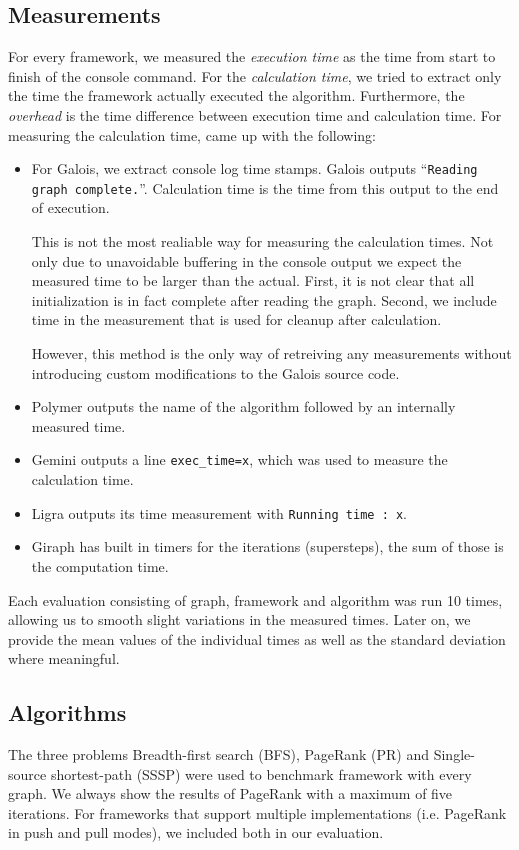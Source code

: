 \subsection{Measurements}
For every framework, we measured the \emph{execution time} as the time from start to finish of the console command.
For the \emph{calculation time}, we tried to extract only the time the framework actually executed the algorithm.
Furthermore, the \emph{overhead} is the time difference between execution time and calculation time.
For measuring the calculation time, came up with the following:
\begin{itemize}
	\item For Galois, we extract console log time stamps. Galois outputs \enquote{\texttt{Reading graph complete.}}. Calculation time is the time from this output to the end of execution.

	This is not the most realiable way for measuring the calculation times.
	Not only due to unavoidable buffering in the console output we expect the measured time to be larger than the actual.
	First, it is not clear that all initialization is in fact complete after reading the graph. Second, we include time in the measurement that is used for cleanup after calculation.

	However, this method is the only way of retreiving any measurements without introducing custom modifications to the Galois source code.

	\item Polymer outputs the name of the algorithm followed by an internally measured time.

	\item Gemini outputs a line \texttt{exec\_time=x}, which was used to measure the calculation time.

	\item Ligra outputs its time measurement with \texttt{Running time : x}.

	\item Giraph has built in timers for the iterations (supersteps), the sum of those is the computation time.
\end{itemize}
Each evaluation consisting of graph, framework and algorithm was run 10 times, allowing us to smooth slight variations in the measured times.
Later on, we provide the mean values of the individual times as well as the standard deviation where meaningful.



\subsection{Algorithms}
The three problems Breadth-first search (BFS), PageRank (PR) and Single-source shortest-path (SSSP) were used to benchmark framework with every graph.
We always show the results of PageRank with a maximum of five iterations.
For frameworks that support multiple implementations (i.e. PageRank in push and pull modes), we included both in our evaluation.

